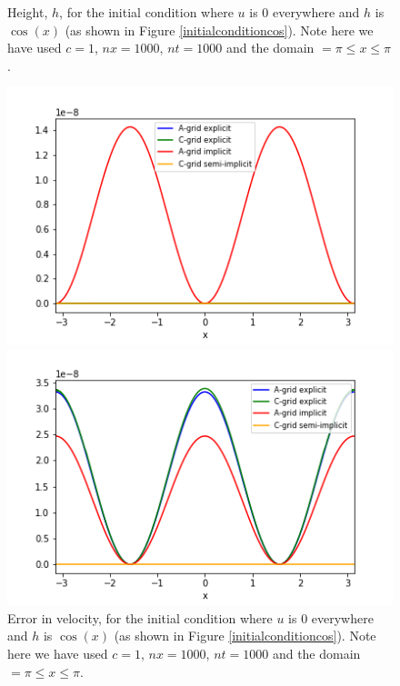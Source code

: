 \documentclass[a4paper,12pt, notitlepage]{article}
\begin{document}
{\begin{figure} [H]
\begin{minipage}{.5\textwidth}
		\caption{\label{exact height} Height, $h$, for the initial condition where $u$ is 0 everywhere and $h$ is $\cos(x)$ (as shown in Figure \ref{initialconditioncos}). Note here we have used $c = 1$, $nx = 1000$, $nt = 1000$ and the domain $=\pi\leq x \leq \pi$.} 
	\end{minipage}
\end{figure}

\begin{figure} [H]
	\begin{minipage}{.5\textwidth}
		\ContinuedFloat*
		\captionsetup{width=0.9\textwidth}
		\captionsetup{justification=centering}
		\includegraphics[width=\textwidth]{error_in_u.png}
		\caption{\label{error_velocity} Error in velocity, for the initial condition where $u$ is 0 everywhere and $h$ is $\cos(x)$ (as shown in Figure \ref{initialconditioncos}). Note here we have used $c = 1$, $nx = 1000$, $nt = 1000$ and the domain $=\pi\leq x \leq \pi$.} 
	\end{minipage}
	\begin{minipage}{.5\textwidth}
		\ContinuedFloat
		\captionsetup{width=0.9\textwidth}
		\captionsetup{justification=centering}
		\includegraphics[width=\textwidth]{error_in_h.png}

\end{minipage}
\end{figure}}
\end{document}
